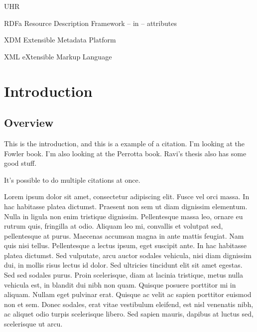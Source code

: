 \documentclass[botnum,fleqn,final]{unmeethesis}
\begin{document}
\tableofcontents
\listoffigures
\listoftables

\begin{glossary}{UHR}
   \item[RDFa] Resource Description Framework -- in -- attributes
   \item[XDM] Extensible Metadata Platform
   \item[XML] eXtensible Markup Language
\end{glossary}

\mainmatter

\chapter{\label{chapter:intro}Introduction}

\section{\label{section:intro:overview}Overview}

This is the introduction, and this is a example of a citation.\cite{JaJa:1992}
I'm looking at the Fowler book.\cite{Fowler:2003} I'm also looking at the
Perrotta book.\cite{Perrotta:2010}  Ravi's thesis also has some good
stuff.\cite{Ravi:2011}

It's possible to do multiple citations at once.\cite{Fowler:2003,Perrotta:2010}

Lorem ipsum dolor sit amet, consectetur adipiscing elit. Fusce vel orci massa.
In hac habitasse platea dictumst. Praesent non sem ut diam dignissim elementum.
Nulla in ligula non enim tristique dignissim. Pellentesque massa leo, ornare eu
rutrum quis, fringilla at odio. Aliquam leo mi, convallis et volutpat sed,
pellentesque at purus. Maecenas accumsan magna in ante mattis feugiat. Nam quis
nisi tellus. Pellentesque a lectus ipsum, eget suscipit ante. In hac habitasse
platea dictumst. Sed vulputate, arcu auctor sodales vehicula, nisi diam
dignissim dui, in mollis risus lectus id dolor. Sed ultricies tincidunt elit
sit amet egestas. Sed sed sodales purus. Proin scelerisque, diam at lacinia
tristique, metus nulla vehicula est, in blandit dui nibh non quam. Quisque
posuere porttitor mi in aliquam. Nullam eget pulvinar erat. Quisque ac velit ac
sapien porttitor euismod non et sem. Donec sodales, erat vitae vestibulum
eleifend, est nisl venenatis nibh, ac aliquet odio turpis scelerisque libero.
Sed sapien mauris, dapibus at luctus sed, scelerisque ut arcu.
\end{document}
